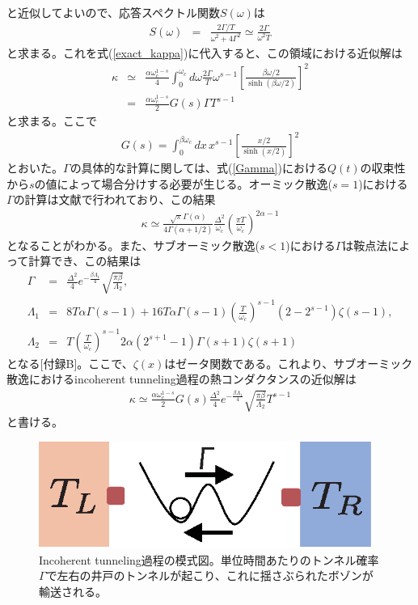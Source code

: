 と近似してよいので、応答スペクトル関数$S(\omega)$は
\begin{eqnarray}
	S(\omega)&=&\frac{2\Gamma/T}{\omega^2+4\Gamma^2}\simeq \frac{2\Gamma}{\omega^2T}
\end{eqnarray}
と求まる。これを式(\ref{exact_kappa})に代入すると、この領域における近似解は
\begin{eqnarray}
	\kappa&\simeq&\frac{\alpha\omega_c^{1-s}}{4}\int_{0}^{\omega_c}d\omega \frac{2\Gamma}{T}\omega^{s-1}\left[\frac{\beta\omega/2}{\sinh{(\beta\omega/2)}}\right]^{2}\\
	&=&\frac{\alpha\omega_c^{1-s}}{2}G(s)\Gamma T^{s-1} 
	\label{sub_ohmic_hightemp}
\end{eqnarray}
と求まる。ここで
\begin{eqnarray}
	G(s)=\int_{0}^{\beta \omega_c}dx\, x^{s-1}\left[\frac{x/2}{\sinh{(x/2)}}\right]^{2}
\end{eqnarray}
とおいた。$\Gamma$の具体的な計算に関しては、式(\ref{Gamma})における$Q(t)$の収束性から$s$の値によって場合分けする必要が生じる。オーミック散逸($s=1$)における$\Gamma$の計算は文献\cite{Weiss12}で行われており、この結果
\begin{eqnarray}
	\kappa\simeq\frac{\sqrt{\pi}\Gamma(\alpha)}{4\Gamma(\alpha+1/2)}\frac{\Delta^2}{\omega_c}\left(\frac{\pi T}{\omega_c}\right)^{2\alpha-1}
	\label{ohmic_incoherent}
\end{eqnarray}
となることがわかる。また、サブオーミック散逸($s<1$)における$\Gamma$は鞍点法によって計算でき、この結果は
\begin{eqnarray}
	\Gamma&=&\frac{\Delta^2}{4}e^{-\frac{\beta \Lambda_1}{4}}\sqrt{\frac{\pi \beta}{\Lambda_2}},\\
	 \Lambda_1&=&8T\alpha\Gamma(s-1)+16T\alpha\Gamma(s-1)\left(\frac{T}{\omega_c}\right)^{s-1}(2-2^{s-1})\zeta(s-1),\\
	 \Lambda_2 &=&T\left(\frac{T}{\omega_c}\right)^{s-1}2\alpha(2^{s+1}-1)\Gamma(s+1)\zeta(s+1)
\end{eqnarray}
となる[付録B]。ここで、$\zeta(x)$はゼータ関数である。これより、サブオーミック散逸におけるincoherent tunneling過程の熱コンダクタンスの近似解は
\begin{eqnarray}
	\kappa\simeq\frac{\alpha\omega_c^{1-s}}{2}G(s)\frac{\Delta^2}{4}e^{-\frac{\beta \Lambda_1}{4}}\sqrt{\frac{\pi \beta}{\Lambda_2}}T^{s-1} 
	\label{sub_ohmic_hightemp}
\end{eqnarray}
と書ける。
\begin{figure}[tb]
	\centering
	\includegraphics[height=3.5cm]{incoherent_tunneling.eps}
	\caption{Incoherent tunneling過程の模式図。単位時間あたりのトンネル確率$\Gamma$で左右の井戸のトンネルが起こり、これに揺さぶられたボゾンが輸送される。}
	\label{fig:incoherent_tunneling}
\end{figure}

